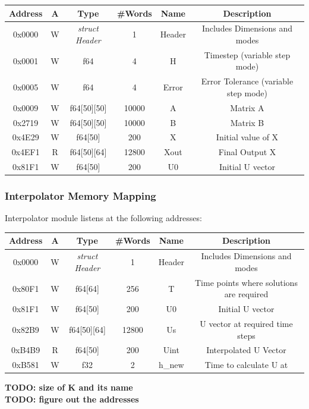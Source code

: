\documentclass[12pt]{extarticle}
\begin{document}
\begin{center}
 \begin{tabular}{||c c c c c c||} 
 \hline
 Address & A & Type & \#Words & Name & Description  \\ [0.5ex] 
 \hline\hline
  0x0000 & W & \emph{struct Header} & 1 & Header & Includes Dimensions and modes  \\ 
 \hline
 0x0001  & W & f64 & 4 & H & Timestep (variable step mode)  \\
 \hline
 0x0005  & W & f64 & 4 & Error & Error Tolerance (variable step mode) \\
 \hline
 0x0009  & W & f64[50][50] & 10000 & A & Matrix A \\
 \hline
 0x2719  & W & f64[50][50] & 10000 & B & Matrix B \\
 \hline
 0x4E29  & W & f64[50] & 200 & X & Initial value of X \\
 \hline
 0x4EF1  & R & f64[50][64] & 12800 & Xout & Final Output X \\ [1ex] 
 \hline
 0x81F1  & W & f64[50] & 200 & U0 & Initial U vector \\
 \hline
\end{tabular}
\end{center}

\subsubsection{Interpolator Memory Mapping}
Interpolator module listens at the following addresses:

\begin{center}
 \begin{tabular}{||c c c c c c||} 
 \hline
 Address & A & Type & \#Words & Name & Description  \\ [0.5ex] 
 \hline\hline
  0x0000 & W & \emph{struct Header} & 1 & Header & Includes Dimensions and modes  \\ 
 \hline
 0x80F1  & W & f64[64] & 256 & T & Time points where solutions are required  \\
 \hline
 0x81F1  & W & f64[50] & 200 & U0 & Initial U vector \\
 \hline
 0x82B9  & W & f64[50][64] & 12800 & Us & U vector at required time steps \\
 \hline
 0xB4B9  & R & f64[50] & 200 & Uint & Interpolated U Vector \\
 \hline
 0xB581  & W & f32 & 2 & h_new & Time to calculate U at \\ [1ex] 
 \hline
\end{tabular}
\end{center}
\textbf{TODO: size of K and its name} \\
\textbf{TODO: figure out the addresses}
\end{document}
